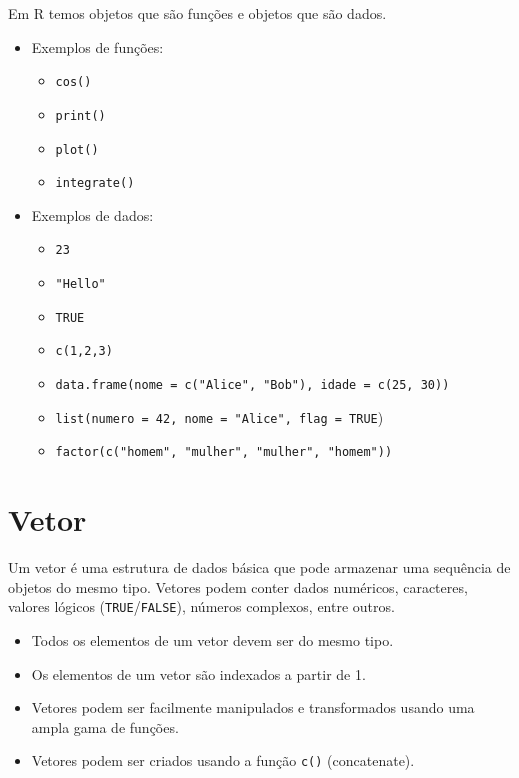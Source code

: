 \documentclass[
]{book}
\providecommand{\tightlist}{%
  \setlength{\itemsep}{0pt}\setlength{\parskip}{0pt}}
\begin{document}
Em R temos objetos que são funções e objetos que são dados.

\begin{itemize}
\tightlist
\item
  Exemplos de funções:

  \begin{itemize}
  \tightlist
  \item
    \texttt{cos()}
  \item
    \texttt{print()}
  \item
    \texttt{plot()}
  \item
    \texttt{integrate()}
  \end{itemize}
\item
  Exemplos de dados:

  \begin{itemize}
  \tightlist
  \item
    \texttt{23}
  \item
    \texttt{"Hello"}
  \item
    \texttt{TRUE}
  \item
    \texttt{c(1,2,3)}
  \item
    \texttt{data.frame(nome\ =\ c("Alice",\ "Bob"),\ idade\ =\ c(25,\ 30))}
  \item
    \texttt{list(numero\ =\ 42,\ nome\ =\ "Alice",\ flag\ =\ TRUE})
  \item
    \texttt{factor(c("homem",\ "mulher",\ "mulher",\ "homem"))}
  \end{itemize}
\end{itemize}

\section{Vetor}\label{vetor}

Um vetor é uma estrutura de dados básica que pode armazenar uma sequência de objetos do mesmo tipo. Vetores podem conter dados numéricos, caracteres, valores lógicos (\texttt{TRUE}/\texttt{FALSE}), números complexos, entre outros.

\begin{itemize}
\item
  Todos os elementos de um vetor devem ser do mesmo tipo.
\item
  Os elementos de um vetor são indexados a partir de 1.
\item
  Vetores podem ser facilmente manipulados e transformados usando uma ampla gama de funções.
\item
  Vetores podem ser criados usando a função \texttt{c()} (concatenate).
\end{itemize}
\end{document}
